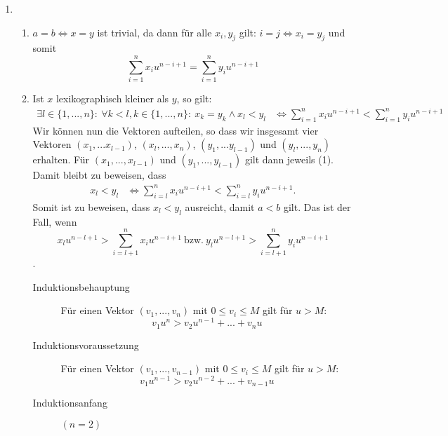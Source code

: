 \documentclass[a4paper,10pt]{scrartcl}
\renewcommand{\labelenumii}{(\theenumii)}
\renewcommand{\theenumii}{\roman{enumii}}
\begin{document}
\begin{enumerate}
\item   \renewcommand{\labelenumii}{(\theenumii)}
        \renewcommand{\theenumii}{\arabic{enumii}}
        \begin{enumerate} \newcommand{\lex}[1]{\ensuremath{\underset{\text{lex}}{#1}}}
        \item	$a = b \Leftrightarrow x = y$ ist trivial, da dann für
	alle $x_i, y_j$ gilt: $i = j \Leftrightarrow x_i = y_j$ und
	somit\\
                \[\sum\limits_{i=1}^{n} x_{i}u^{n-i+1} = \sum\limits_{i=1}^{n} y_{i}u^{n-i+1}\]
	\item	Ist $x$ lexikographisch kleiner als $y$, so gilt:
                \begin{align*}
                    \exists l \in \{1, ..., n\}{:}\ \forall k < l, k \in \{1, ..., n\}{:}\ x_k = y_k \land x_l < y_l 
                        &\Leftrightarrow \sum\limits_{i=1}^{n} x_{i}u^{n-i+1} < \sum\limits_{i=1}^{n} y_{i}u^{n-i+1}
                \end{align*}
		Wir können nun die Vektoren aufteilen, so dass wir
		insgesamt vier Vektoren $(x_1,...x_{l-1})$,
		$(x_l,...,x_n)$, $(y_1,...y_{l-1})$ und
		$(y_l,...,y_n)$ erhalten. Für $(x_1, ..., x_{l-1})$ und $(y_1, ..., y_{l-1})$ gilt 
                dann jeweils (1). Damit bleibt zu beweisen, dass
                \begin{align*}
                    x_l < y_l 
                        &\Leftrightarrow \sum\limits_{i=l}^{n} x_{i}u^{n-i+1} < \sum\limits_{i=l}^{n} y_{i}u^{n-i+1}.
                \end{align*}
		Somit ist zu beweisen, dass $x_l < y_l$ ausreicht, damit
		$a < b$ gilt. Das ist der Fall, wenn
                \[x_l u^{n-l+1} > \sum\limits_{i=l+1}^{n} x_{i}u^{n-i+1}\ \text{bzw.}\ y_l u^{n-l+1} > \sum\limits_{i=l+1}^{n} y_{i}u^{n-i+1}\].
                \begin{description}
                \item[Induktionsbehauptung] Für einen Vektor $(v_1,...,v_n)$ mit $0 \leq v_i \leq M$ gilt für $u > M$:
                        \[v_1 u^n > v_2 u^{n-1} + ... + v_n u\]
                \item[Induktionsvoraussetzung] Für einen Vektor $(v_1,...,v_{n-1})$ mit $0 \leq v_i \leq M$ gilt für $u > M$:
                        \[v_1 u^{n-1} > v_2 u^{n-2} + ... + v_{n-1} u\]
                \item[Induktionsanfang] $(n = 2)$
                        \begin{align*}

\end{align*}
\end{description}
\end{enumerate}
\end{enumerate}
\end{document}
